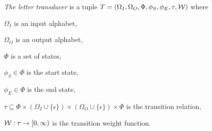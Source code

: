 \documentclass{beamer}
\begin{document}
\newcommand\nullmodel{{\cal N}}
\newcommand\substitute{{\cal S}}
\newcommand\tkf{{\cal B}}
\newcommand\tkfroot{R}
\newcommand\formaldefs{{\bf Formal definitions: }}
\newcommand\charat[2]{\mbox{symbol}(#1,#2)}
\newcommand\gappedalphabet[1]{(\Omega_{#1} \cup \{\epsilon\})}
\newcommand\gapsquared{\gappedalphabet{}^2}
\newcommand\gappedpair[2]{\gappedalphabet{#1} \times \gappedalphabet{#2}}
\newcommand\wtrans[4]{#1(#2 : [#3] : #4)}
\newcommand\transequiv{\equiv}
\newcommand\compose{}
\newcommand\identity{{\cal I}}
\newcommand\fork{\circ}
\newcommand\idfork{\Upsilon}
\newcommand\forkn[1]{\idfork(#1)}
\newcommand\forkfun[2]{\forkn{#1, #2}}
\newcommand\generate{\Delta}
\newcommand\recognize{\nabla}
\newcommand\States{\Phi}
\newcommand\statesof[1]{\States_{#1}}
\newcommand\Transitions{\tau}
\newcommand\transitionsof[1]{\Transitions_{#1}}
\newcommand\startstate{\phi_S}
\newcommand\laststate{\phi_E}
\newcommand\startstateof[1]{\phi_{S;#1}}
\newcommand\laststateof[1]{\phi_{E;#1}}
\newcommand\weight{{\cal W}}
\newcommand\transweightfun{\weight_{\mbox{\tiny trans}}}
\newcommand\emitweightfun{\weight_{\mbox{\tiny emit}}}
\newcommand\sumoverpaths[1]{\transweightfun(\{\pi_{#1}\})}
\newcommand\statesoftype[1]{\States_{#1}}
\newcommand\statetype{\mbox{\tiny type}}
\newcommand\dup[1]{\left( \begin{array}{l} #1 \\ #1 \end{array} \right)}
\newcommand\seqlen[1]{\mbox{len}(#1)}
\newcommand\projection{{\cal P}}

\begin{frame}{}

{\em The letter transducer} is a tuple $T = (\Omega_I, \Omega_O, \States, \startstate, \laststate, \Transitions, \weight)$
where
\itemb
\item $\Omega_I$ is an input alphabet,
\item $\Omega_O$ is an output alphabet,
\item $\States$ is a set of states,
\item $\startstate \in \States$ is the start state,
\item $\laststate \in \States$ is the end state,
\item $\Transitions \subseteq \States \times \gappedalphabet{I} \times \gappedalphabet{O} \times \States$ is the transition relation,
\item $\weight:\Transitions \to [0,\infty)$ is the transition weight function.
\iteme
\end{frame}
\end{document}
